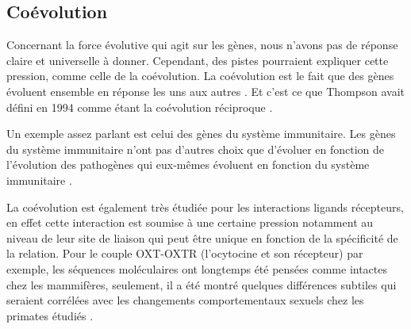 \subsection{Coévolution}\label{coevo}
\par Concernant la force évolutive qui agit sur les gènes, nous n’avons pas de réponse claire et universelle à donner. Cependant, des pistes pourraient expliquer cette pression, comme celle de la coévolution. La coévolution est le fait que des gènes évoluent ensemble en réponse les uns aux autres \parencite{lovell_integrated_2010}. Et c'est ce que Thompson avait défini en 1994 comme étant la coévolution réciproque \parencite{thompson_coevolutionary_1994}. 
\par Un exemple assez parlant est celui des gènes du système immunitaire. Les gènes du système immunitaire n’ont pas d’autres choix que d’évoluer en fonction de l’évolution des pathogènes qui eux-mêmes évoluent en fonction du système immunitaire \parencite{schlesinger_coevolutionary_2014}. 
\par La coévolution est également très étudiée pour les interactions ligands récepteurs, en effet cette interaction est soumise à une certaine pression notamment au niveau de leur site de liaison qui peut être unique en fonction de la spécificité de la relation. Pour le couple OXT-OXTR (l’ocytocine et son récepteur) par exemple, les séquences moléculaires ont longtemps été pensées comme intactes chez les mammifères, seulement, il a été montré quelques différences subtiles qui seraient corrélées avec les changements comportementaux sexuels chez les primates étudiés \parencite{vargas-pinilla_evolutionary_2015}.

